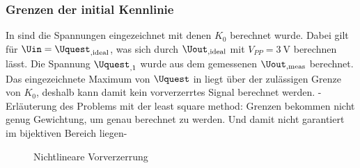 \documentclass[../Report.tex]{subfiles}
\begin{document}
\subsubsection*{Grenzen der initial Kennlinie}
\label{subsubsec:opt.adjusta.problem}
In  sind die Spannungen eingezeichnet mit denen $K_0$ berechnet wurde. Dabei gilt für $\Uin = \Uquest_{,\mathrm{ideal}}$, was sich durch $\Uout_{,\mathrm{ideal}}$ mit $V_{PP} = \SI{3}{\V}$ berechnen lässt. Die Spannung $\Uquest_{,1}$ wurde aus dem gemessenen $\Uout_{,\mathrm{meas}}$ berechnet.\\
Das eingezeichnete Maximum von $\Uquest$ in  liegt über der zulässigen Grenze von $K_0$, deshalb kann damit kein vorverzerrtes Signal berechnet werden.
-Erläuterung des Problems mit der least square method: Grenzen bekommen nicht genug Gewichtung, um genau berechnet zu werden. Und damit nicht garantiert im bijektiven Bereich liegen-

\begin{figure}[H]
\begin{subfigure}{0.5 \textwidth}
	\setlength\figureheight{8cm}
	\setlength\figurewidth{8cm}
	\label{fig:K0}
\end{subfigure}
\begin{subfigure}{0.5 \textwidth}
	\setlength\figureheight{8cm}
	\setlength\figurewidth{8cm}
	\label{fig:UinUquest}
\end{subfigure}
\caption{Nichtlineare Vorverzerrung}
\label{fig:Amplitudenproblem}
\end{figure}
\end{document}
